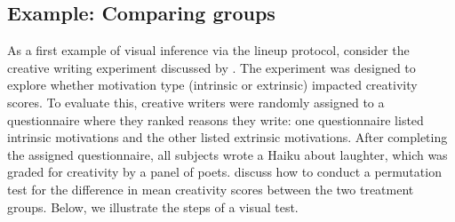 \documentclass[12pt]{article}
\begin{document}
\hypertarget{example-comparing-groups}{%
\subsection{Example: Comparing groups}\label{example-comparing-groups}}

As a first example of visual inference via the lineup protocol, consider
the creative writing experiment discussed by \citet{ramsey2013}. The
experiment was designed to explore whether motivation type (intrinsic or
extrinsic) impacted creativity scores. To evaluate this, creative
writers were randomly assigned to a questionnaire where they ranked
reasons they write: one questionnaire listed intrinsic motivations and
the other listed extrinsic motivations. After completing the assigned
questionnaire, all subjects wrote a Haiku about laughter, which was
graded for creativity by a panel of poets. \citet{ramsey2013} discuss
how to conduct a permutation test for the difference in mean creativity
scores between the two treatment groups. Below, we illustrate the steps
of a visual test.
\end{document}
